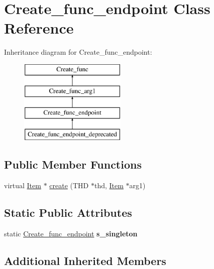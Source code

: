 \hypertarget{classCreate__func__endpoint}{}\section{Create\+\_\+func\+\_\+endpoint Class Reference}
\label{classCreate__func__endpoint}
Inheritance diagram for Create\+\_\+func\+\_\+endpoint\+:\begin{figure}[H]
\begin{center}
\leavevmode
\includegraphics[height=4.000000cm]{classCreate__func__endpoint}
\end{center}
\end{figure}
\subsection*{Public Member Functions}
\begin{DoxyCompactItemize}
\item 
virtual \mbox{\hyperlink{classItem}{Item}} $\ast$ \mbox{\hyperlink{classCreate__func__endpoint_a3e58761794e07878165e882e8d66b7d9}{create}} (T\+HD $\ast$thd, \mbox{\hyperlink{classItem}{Item}} $\ast$arg1)
\end{DoxyCompactItemize}
\subsection*{Static Public Attributes}
\begin{DoxyCompactItemize}
\item 
\mbox{\label{classCreate__func__endpoint_aba98d8817ab9fbaeacff0eda6be2e8cd}} 
static \mbox{\hyperlink{classCreate__func__endpoint}{Create\+\_\+func\+\_\+endpoint}} {\bfseries s\+\_\+singleton}
\end{DoxyCompactItemize}
\subsection*{Additional Inherited Members}


